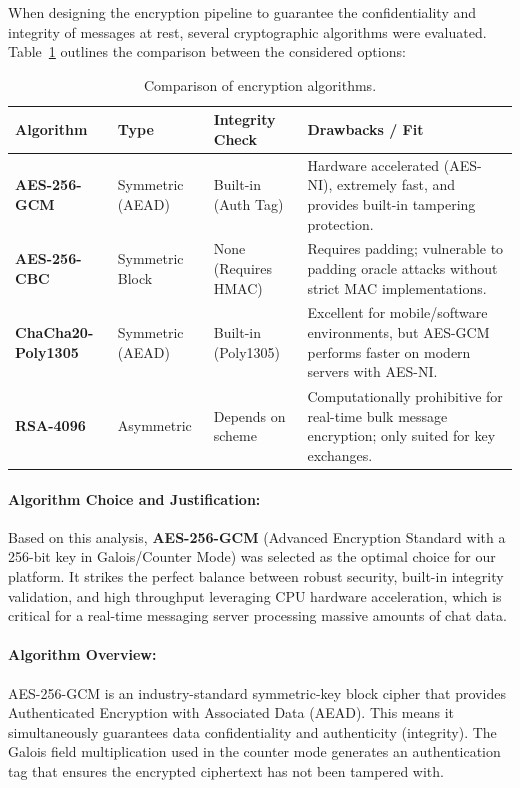 When designing the encryption pipeline to guarantee the confidentiality and integrity of messages at rest, several cryptographic algorithms were evaluated. Table~\ref{tab:crypto_comparison} outlines the comparison between the considered options:

\renewcommand{\arraystretch}{1.15}
\begin{table}[H]
    \centering
    \small
    \begin{tabular}{| p{3cm} | p{2.2cm} | p{2.8cm} | p{6.5cm} |}
        \hline
        \rowcolor{lightgray}
        \textbf{Algorithm} & \textbf{Type} & \textbf{Integrity Check} & \textbf{Drawbacks / Fit} \\
        \hline
        \textbf{AES-256-GCM} & Symmetric (AEAD) & Built-in (Auth Tag) & Hardware accelerated (AES-NI), extremely fast, and provides built-in tampering protection. \\
        \hline
        \textbf{AES-256-CBC} & Symmetric Block & None (Requires HMAC) & Requires padding; vulnerable to padding oracle attacks without strict MAC implementations. \\
        \hline
        \textbf{ChaCha20-Poly1305} & Symmetric (AEAD) & Built-in (Poly1305) & Excellent for mobile/software environments, but AES-GCM performs faster on modern servers with AES-NI. \\
        \hline
        \textbf{RSA-4096} & Asymmetric & Depends on scheme & Computationally prohibitive for real-time bulk message encryption; only suited for key exchanges. \\
        \hline
    \end{tabular}
    \vspace{0.2cm}
    \caption{Comparison of encryption algorithms.}
    \label{tab:crypto_comparison}
\end{table}
\renewcommand{\arraystretch}{1.0}

\paragraph{Algorithm Choice and Justification:}
Based on this analysis, \textbf{AES-256-GCM} (Advanced Encryption Standard with a 256-bit key in Galois/Counter Mode) was selected as the optimal choice for our platform. It strikes the perfect balance between robust security, built-in integrity validation, and high throughput leveraging CPU hardware acceleration, which is critical for a real-time messaging server processing massive amounts of chat data.

\paragraph{Algorithm Overview:}
AES-256-GCM is an industry-standard symmetric-key block cipher that provides Authenticated Encryption with Associated Data (AEAD). This means it simultaneously guarantees data confidentiality and authenticity (integrity). The Galois field multiplication used in the counter mode generates an authentication tag that ensures the encrypted ciphertext has not been tampered with.

